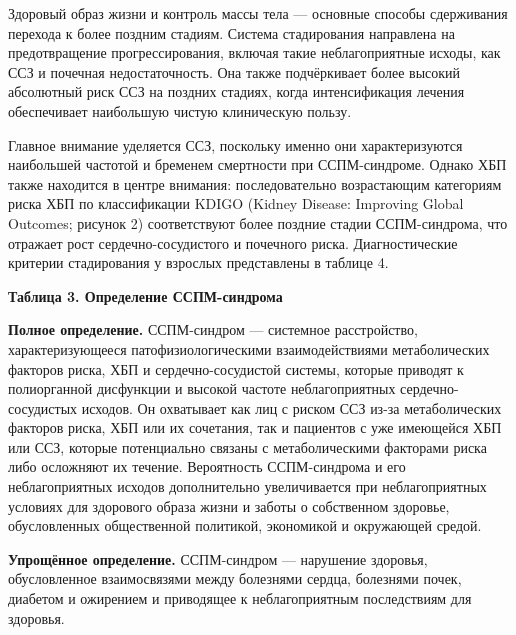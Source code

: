 \documentclass[11pt,a4paper]{article}
\newcommand{\heading}[1]{\par\medskip\textbf{#1}\par}
\begin{document}
Здоровый образ жизни и контроль массы тела --- основные способы сдерживания перехода к более поздним стадиям. Система стадирования направлена на предотвращение прогрессирования, включая такие неблагоприятные исходы, как ССЗ и почечная недостаточность. Она также подчёркивает более высокий абсолютный риск ССЗ на поздних стадиях, когда интенсификация лечения обеспечивает наибольшую чистую клиническую пользу.

Главное внимание уделяется ССЗ, поскольку именно они характеризуются наибольшей частотой и бременем смертности при ССПМ-синдроме. Однако ХБП также находится в центре внимания: последовательно возрастающим категориям риска ХБП по классификации KDIGO (Kidney Disease: Improving Global Outcomes; рисунок 2) соответствуют более поздние стадии ССПМ-синдрома, что отражает рост сердечно-сосудистого и почечного риска. Диагностические критерии стадирования у взрослых представлены в таблице 4.

\heading{Таблица 3. Определение ССПМ-синдрома}
\textbf{Полное определение.} ССПМ-синдром --- системное расстройство, характеризующееся патофизиологическими взаимодействиями метаболических факторов риска, ХБП и сердечно-сосудистой системы, которые приводят к полиорганной дисфункции и высокой частоте неблагоприятных сердечно-сосудистых исходов. Он охватывает как лиц с риском ССЗ из-за метаболических факторов риска, ХБП или их сочетания, так и пациентов с уже имеющейся ХБП или ССЗ, которые потенциально связаны с метаболическими факторами риска либо осложняют их течение. Вероятность ССПМ-синдрома и его неблагоприятных исходов дополнительно увеличивается при неблагоприятных условиях для здорового образа жизни и заботы о собственном здоровье, обусловленных общественной политикой, экономикой и окружающей средой.

\textbf{Упрощённое определение.} ССПМ-синдром --- нарушение здоровья, обусловленное взаимосвязями между болезнями сердца, болезнями почек, диабетом и ожирением и приводящее к неблагоприятным последствиям для здоровья.
\end{document}
